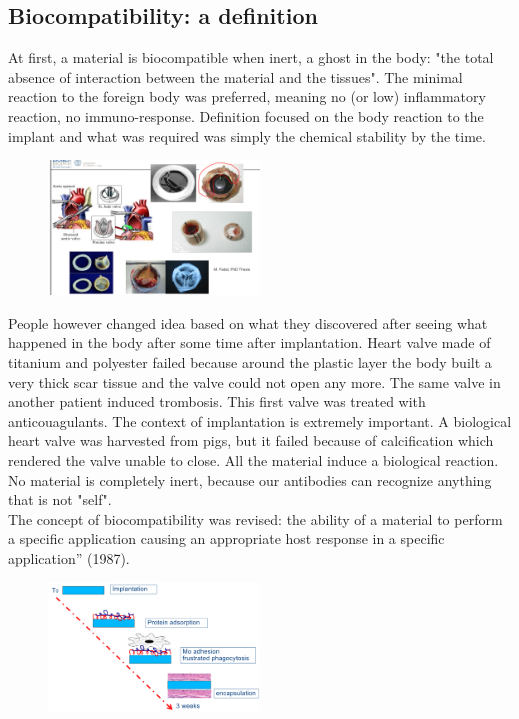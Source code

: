 	\subsection{Biocompatibility: a definition}
	At first, a material is biocompatible when inert, a ghost in the body: "the total absence of interaction between the material and the tissues".
	The minimal reaction to the foreign body was preferred, meaning no (or low) inflammatory reaction, no immuno-response.
	Definition focused on the body reaction to the implant and what was required was simply the chemical stability by the time.
	\\
	\begin{figure}[ht]
\centering
\includegraphics[width=0.5\textwidth]{valves.png}
\caption{\label{fig:valves}}
\end{figure}
	People however changed idea based on what they discovered after seeing what happened in the body after some time after implantation.
	Heart valve made of titanium and polyester failed because around the plastic layer the body built a very thick scar tissue and the valve could not open any more.
	The same valve in another patient induced trombosis.
	This first valve was treated with anticouagulants.
	The context of implantation is extremely important.
	A biological heart valve was harvested from pigs, but it failed because of calcification which rendered the valve unable to close.
	All the material induce a biological reaction.
	No material is completely inert, because our antibodies can recognize anything that is not "self".
	\\
	The concept of biocompatibility was revised: the ability of a material to perform a specific application causing an appropriate host response in a specific application” (1987).
	\\
	\begin{figure}[ht]
\centering
\includegraphics[width=0.5\textwidth]{fbrx.png}
\caption{\label{fig:matrixome}}
\end{figure}
